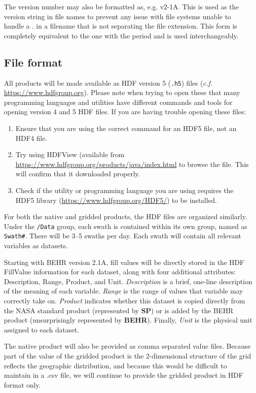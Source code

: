 \documentclass[12pt]{article}
\begin{document}
	The version number may also be formatted as, e.g. v2-1A. This is used as the version
string in file names to prevent any issue with file systems unable to handle a . in
a filename that is not separating the file extension. This form is completely
equivalent to the one with the period and is used interchangeably.
	
	\subsection{File format}
	All products will be made available as HDF version 5 (\texttt{.h5}) files (\emph{c.f.} \url{https://www.hdfgroup.org}).  Please note when trying to open these that many programming languages and utilities have different commands and tools for opening version 4 and 5 HDF files. If you are having trouble opening these files:
	\begin{enumerate}
		\item Ensure that you are using the correct command for an HDF5 file, not an HDF4 file.
		\item Try using HDFView (available from \url{https://www.hdfgroup.org/products/java/index.html} to browse the file. This will confirm that it downloaded properly.
		\item Check if the utility or programming language you are using requires the HDF5 library (\url{https://www.hdfgroup.org/HDF5/}) to be installed. 
	\end{enumerate}
	
	For both the native and gridded products, the HDF files are organized similarly. Under the \texttt{/Data} group, each swath is contained within its own group, named as \texttt{Swath\#}. There will be 3--5 swaths per day. Each swath will contain all relevant variables as datasets.
	
	Starting with BEHR version 2.1A, fill values will be directly stored in the HDF FillValue information for each dataset, along with four additional attributes: Description, Range, Product, and Unit.  \emph{Description} is a brief, one-line description of the meaning of each variable. \emph{Range} is the range of values that variable may correctly take on. \emph{Product} indicates whether this dataset is copied directly from the NASA standard product (represented by \textbf{SP}) or is added by the BEHR product (unsurprisingly represented by \textbf{BEHR}). Finally, \emph{Unit} is the physical unit assigned to each dataset. 
	
	The native product will also be provided as comma separated value files. Because part of the value of the gridded product is the 2-dimensional structure of the grid reflects the geographic distribution, and because this would be difficult to maintain in a .csv file, we will continue to provide the gridded product in HDF format only.
	
\end{document}
